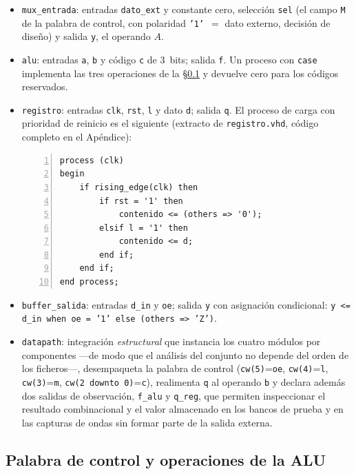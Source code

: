 \documentclass[llncs]{llncs}
\begin{document}
\begin{itemize}
  \item \texttt{mux\_entrada}: entradas \texttt{dato\_ext} y constante
    cero, selección \texttt{sel} (el campo \texttt{M} de la palabra de
    control, con polaridad \texttt{'1'}~$=$ dato externo, decisión de
    diseño) y salida \texttt{y}, el operando $A$.
  \item \texttt{alu}: entradas \texttt{a}, \texttt{b} y código
    \texttt{c} de 3~bits; salida \texttt{f}. Un proceso con
    \texttt{case} implementa las tres operaciones de la
    §\ref{sec:alu-op} y devuelve cero para los códigos reservados.
  \item \texttt{registro}: entradas \texttt{clk}, \texttt{rst}, \texttt{l}
    y dato \texttt{d}; salida \texttt{q}. El proceso de carga con
    prioridad de reinicio es el siguiente (extracto de
    \texttt{registro.vhd}, código completo en el Apéndice):

\begin{lstlisting}[caption={\texttt{registro.vhd} --- proceso de carga con
  prioridad de reinicio}, label=lst:registro, numbers=left]
process (clk)
begin
    if rising_edge(clk) then
        if rst = '1' then
            contenido <= (others => '0');
        elsif l = '1' then
            contenido <= d;
        end if;
    end if;
end process;
\end{lstlisting}

  \item \texttt{buffer\_salida}: entradas \texttt{d\_in} y \texttt{oe};
    salida \texttt{y} con asignación condicional:
    \texttt{y <= d\_in when oe = '1' else (others => 'Z')}.
  \item \texttt{datapath}: integración \emph{estructural} que instancia
    los cuatro módulos por componentes ---de modo que el análisis del
    conjunto no depende del orden de los ficheros---, desempaqueta la
    palabra de control (\texttt{cw(5)}=\texttt{oe}, \texttt{cw(4)}=\texttt{l},
    \texttt{cw(3)}=\texttt{m}, \texttt{cw(2~downto~0)}=\texttt{c}),
    realimenta \texttt{q} al operando \texttt{b} y declara además dos
    salidas de observación, \texttt{f\_alu} y \texttt{q\_reg}, que
    permiten inspeccionar el resultado combinacional y el valor
    almacenado en los bancos de prueba y en las capturas de ondas sin
    formar parte de la salida externa.
\end{itemize}

\subsection{Palabra de control y operaciones de la ALU}
\label{sec:alu-op}
\end{document}
